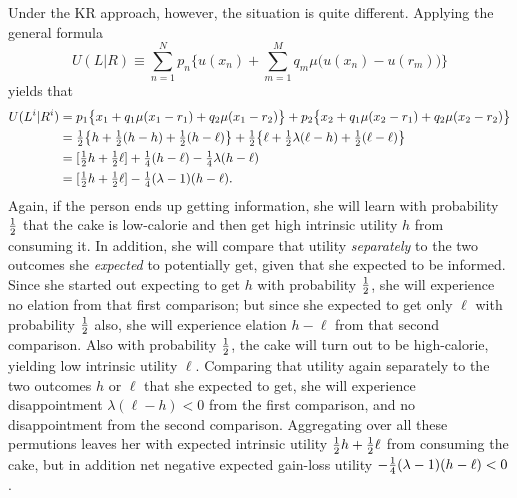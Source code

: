 Under the KR approach, however, the situation is quite different. Applying the
general formula
\begin{equation*}
  U(L|R) \equiv \sum_{n=1}^N p_n\biggl\{u(x_n) + \sum_{m=1}^M q_m
\mu\bigl(u(x_n) - u(r_m)\bigr)\biggr\}
\end{equation*}
yields that
\begin{align*}
  U(L^i|R^i)
&= p_1\bigl\{x_1 + q_1\mu(x_1 - r_1) + q_2\mu(x_1 - r_2)\bigr\}
 + p_2\bigl\{x_2 + q_1\mu(x_2 - r_1) + q_2\mu(x_2 - r_2)\bigr\}\\
&= \tfrac{1}{2}\bigl\{h + \tfrac{1}{2}(h - h) + \tfrac{1}{2}(h - \ell)\bigr\}
 + \tfrac{1}{2}\bigl\{\ell + \tfrac{1}{2}\lambda(\ell - h) + \tfrac{1}{2}(\ell - \ell)\bigr\}\\
&= [\tfrac{1}{2} h + \tfrac{1}{2} \ell] +
    \tfrac{1}{4} (h-\ell) - \tfrac{1}{4} \lambda(h-\ell)\\
&= [\tfrac{1}{2} h + \tfrac{1}{2} \ell] - \tfrac{1}{4}(\lambda-1)(h - \ell).
\end{align*}
Again, if the person ends up getting information, she will learn with
probability $\tfrac{1}{2}$ that the cake is low-calorie and then get high intrinsic
utility $h$ from consuming it. In addition, she will compare that utility {\em
separately} to the two outcomes she {\em expected} to potentially get, given
that she expected to be informed. Since she started out expecting to get $h$
with probability $\tfrac{1}{2}$, she will experience no elation from that first
comparison; but since she expected to get only $\ell$ with probability $\tfrac{1}{2}$
also, she will experience elation $h-\ell$ from that second comparison. Also
with probability $\tfrac{1}{2}$, the cake will turn out to be high-calorie, yielding
low intrinsic utility $\ell$. Comparing that utility again separately to the
two outcomes $h$ or $\ell$ that she expected to get, she will experience
disappointment $\lambda(\ell - h) < 0$ from the first comparison, and no
disappointment from the second comparison. Aggregating over all these
permutions leaves her with expected intrinsic utility $\tfrac{1}{2} h + \tfrac{1}{2} \ell$
from consuming the cake, but in addition net negative expected gain-loss
utility $-\tfrac{1}{4}(\lambda - 1)(h - \ell) < 0$.

